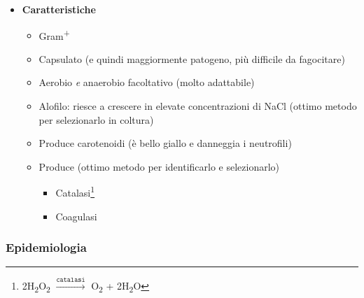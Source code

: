 \documentclass[italian,]{article}
\providecommand{\tightlist}{%
  \setlength{\itemsep}{0pt}\setlength{\parskip}{0pt}}
\begin{document}
\begin{itemize}
\tightlist
\item
  \textbf{Caratteristiche}

  \begin{itemize}
  \tightlist
  \item
    Gram\textsuperscript{+}
  \item
    Capsulato (e quindi maggiormente patogeno, più difficile da
    fagocitare)
  \item
    Aerobio \emph{e} anaerobio facoltativo (molto adattabile)
  \item
    Alofilo: riesce a crescere in elevate concentrazioni di NaCl (ottimo
    metodo per selezionarlo in coltura)
  \item
    Produce carotenoidi (è bello giallo e danneggia i neutrofili)
  \item
    Produce (ottimo metodo per identificarlo e selezionarlo)

    \begin{itemize}
    \tightlist
    \item
      Catalasi\footnote{2H\textsubscript{2}O\textsubscript{2}
        \(\xrightarrow{\texttt{catalasi}}\) O\textsubscript{2} +
        2H\textsubscript{2}O}
    \item
      Coagulasi
    \end{itemize}
  \end{itemize}
\end{itemize}

\hypertarget{epidemiologia}{%
\subsubsection{Epidemiologia}\label{epidemiologia}}
\end{document}
